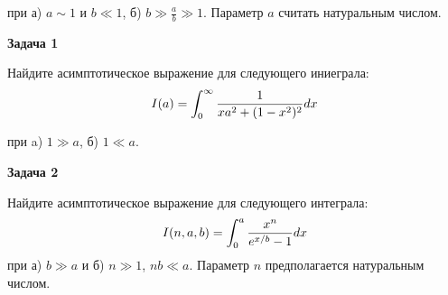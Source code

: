 \documentclass[a4paper,12pt]{article}
\begin{document}
\noindent при а) $a\sim 1$ и $b\ll 1$, б) $b\gg\frac{a}{b}\gg 1$. Параметр $a$ считать натуральным числом.

\vspace{15pt}
\noindent \textbf{Задача 1}

\noindent Найдите асимптотическое выражение для следующего иниеграла:
\begin{equation}
\notag
I(a)=\int_{0}^{\infty}\frac{1}{xa^{2}+(1-x^{2})^{2}}dx	
\end{equation}

\noindent при a) $1\gg a$, б) $1\ll a$.

\vspace{15pt}
\noindent \textbf{Задача 2}

\noindent Найдите асимптотическое выражение для следующего интеграла:
\begin{equation}\notag
I(n,a,b)	=\int_{0}^{a}\frac{x^{n}}{e^{x/b}-1}dx
\end{equation}
\noindent при а) $b\gg a$ и б) $n\gg 1$, $nb\ll a$. Параметр $n$ предполагается натуральным числом.
\end{document}
